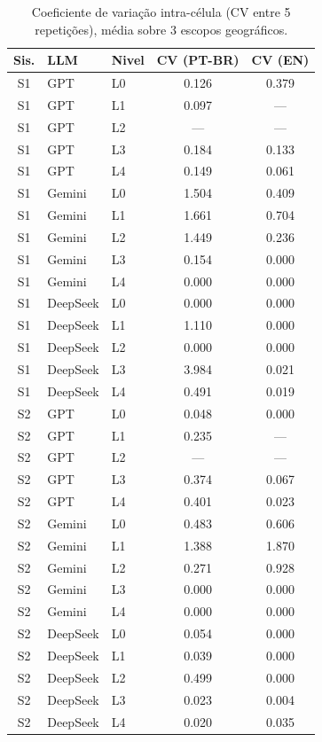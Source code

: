 \begin{table}[h]
\centering
\small
\caption{Coeficiente de varia\c{c}\~ao intra-c\'elula (CV entre 5 repeti\c{c}\~oes), m\'edia sobre 3 escopos geogr\'aficos.}
\label{tab:sm_cv}
\begin{tabular}{cllcc}
\toprule
\textbf{Sis.} & \textbf{LLM} & \textbf{Nivel} & \textbf{CV (PT-BR)} & \textbf{CV (EN)} \\
\midrule
S1 & GPT & L0 & 0.126 & 0.379 \\
S1 & GPT & L1 & 0.097 & --- \\
S1 & GPT & L2 & --- & --- \\
S1 & GPT & L3 & 0.184 & 0.133 \\
S1 & GPT & L4 & 0.149 & 0.061 \\
S1 & Gemini & L0 & 1.504 & 0.409 \\
S1 & Gemini & L1 & 1.661 & 0.704 \\
S1 & Gemini & L2 & 1.449 & 0.236 \\
S1 & Gemini & L3 & 0.154 & 0.000 \\
S1 & Gemini & L4 & 0.000 & 0.000 \\
S1 & DeepSeek & L0 & 0.000 & 0.000 \\
S1 & DeepSeek & L1 & 1.110 & 0.000 \\
S1 & DeepSeek & L2 & 0.000 & 0.000 \\
S1 & DeepSeek & L3 & 3.984 & 0.021 \\
S1 & DeepSeek & L4 & 0.491 & 0.019 \\
\midrule
S2 & GPT & L0 & 0.048 & 0.000 \\
S2 & GPT & L1 & 0.235 & --- \\
S2 & GPT & L2 & --- & --- \\
S2 & GPT & L3 & 0.374 & 0.067 \\
S2 & GPT & L4 & 0.401 & 0.023 \\
S2 & Gemini & L0 & 0.483 & 0.606 \\
S2 & Gemini & L1 & 1.388 & 1.870 \\
S2 & Gemini & L2 & 0.271 & 0.928 \\
S2 & Gemini & L3 & 0.000 & 0.000 \\
S2 & Gemini & L4 & 0.000 & 0.000 \\
S2 & DeepSeek & L0 & 0.054 & 0.000 \\
S2 & DeepSeek & L1 & 0.039 & 0.000 \\
S2 & DeepSeek & L2 & 0.499 & 0.000 \\
S2 & DeepSeek & L3 & 0.023 & 0.004 \\
S2 & DeepSeek & L4 & 0.020 & 0.035 \\
\bottomrule
\end{tabular}
\end{table}
